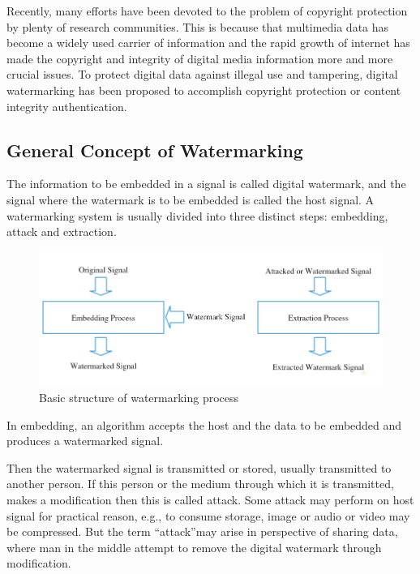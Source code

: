 \documentclass[12pt,a4paper]{report}
\begin{document}
\bigskip

Recently, many efforts have been devoted to the problem of copyright protection by plenty of research communities. This is because that multimedia data has become a widely used carrier of information and the rapid growth of internet has made the copyright and integrity of digital media information more and more crucial issues. To protect digital data against illegal use and tampering, digital watermarking has been proposed to accomplish copyright protection or content
integrity authentication.


\subsection{General Concept of Watermarking}

The information to be embedded in a signal is called digital watermark, and the signal where the watermark is to be embedded is called the host signal. A watermarking system is usually divided into three distinct steps: embedding, attack and extraction.

\begin{figure}[h!]
\centering
\includegraphics[scale=0.6]{image/WatermakProcess.png}
\caption{Basic structure of watermarking process}
\label{fig:wtrprocess}
\end{figure}

\bigskip

In embedding, an algorithm accepts the host and the data to be embedded and produces a watermarked signal.

\bigskip

Then the watermarked signal is transmitted or stored, usually transmitted to another person. If this person or the medium through which it is transmitted, makes a modification then this is called attack. Some attack may perform on host signal for practical reason, e.g., to consume storage, image or audio or video may be compressed. But the term \textquotedblleft attack\textquotedblright may arise in perspective of sharing data, where man in the middle attempt to remove the digital watermark through modification.
\end{document}
